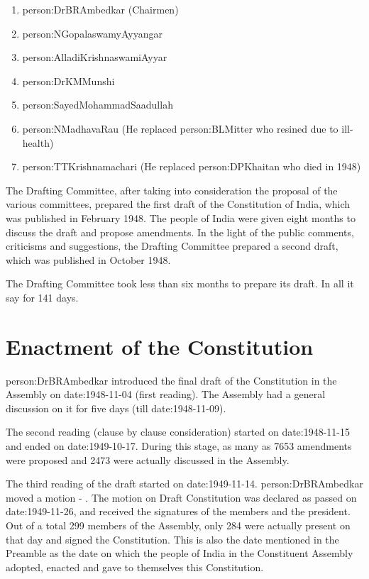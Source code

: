\begin{enumerate}
  \item \gls{person:DrBRAmbedkar} ({ Chairmen})
  \item \gls{person:NGopalaswamyAyyangar}
  \item \gls{person:AlladiKrishnaswamiAyyar}
  \item \gls{person:DrKMMunshi}
  \item \gls{person:SayedMohammadSaadullah}
  \item \gls{person:NMadhavaRau} (He replaced \gls{person:BLMitter} who resined due to ill-health)
  \item \gls{person:TTKrishnamachari} (He replaced \gls{person:DPKhaitan} who died in 1948)
\end{enumerate}

The Drafting Committee, after taking into consideration the proposal of the various committees, prepared the first draft of the Constitution of India, which was published in February 1948. The people of India were given eight months to discuss the draft and propose amendments. In the light of the public comments, criticisms and suggestions, the Drafting Committee prepared a second draft, which was published in October 1948.

The Drafting Committee took less than six months to prepare its draft. In all it say for 141 days.

\section{Enactment of the Constitution}

\gls{person:DrBRAmbedkar} introduced the final draft of the Constitution in the Assembly on \gls{date:1948-11-04} (first reading). The Assembly had a general discussion on it for five days (till \gls{date:1948-11-09}).

The second reading (clause by clause consideration) started on \gls{date:1948-11-15} and ended on \gls{date:1949-10-17}. During this stage, as many as 7653 amendments were proposed and 2473 were actually discussed in the Assembly.

The third reading of the draft started on \gls{date:1949-11-14}. \gls{person:DrBRAmbedkar} moved a motion - . The motion on Draft Constitution was declared as passed on \gls{date:1949-11-26}, and received the signatures of the members and the president. Out of a total 299 members of the Assembly, only 284 were actually present on that day and signed the Constitution. This is also the date mentioned in the Preamble as the date on which the people of India in the Constituent Assembly adopted, enacted and gave to themselves this Constitution.

